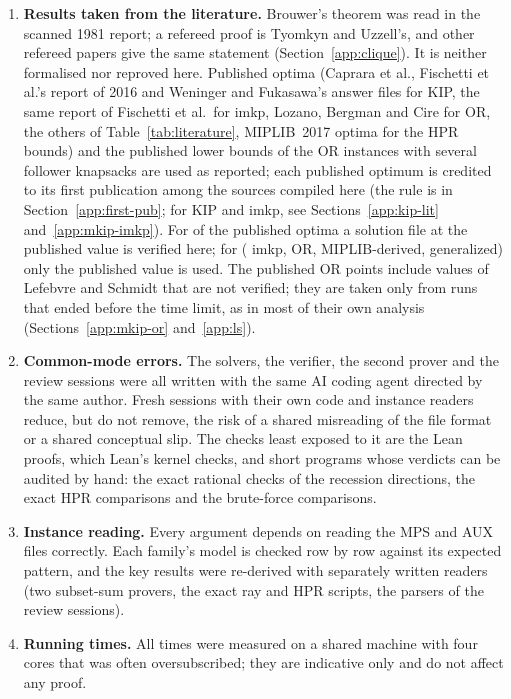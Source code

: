 \begin{enumerate}
\item \textbf{Results taken from the literature.} Brouwer's
theorem\cite{brouwer1981lotto} was read in the scanned 1981 report; a refereed
proof is Tyomkyn and Uzzell's,\cite{tyomkyn2015strong} and other refereed papers
give the same statement (Section~\ref{app:clique}). It is neither formalised nor
reproved here. Published optima (Caprara et al., Fischetti et al.'s report of
2016 and Weninger and Fukasawa's answer
files\cite{caprara2016bilevel,fischetti2016monotonicity,weninger_bkpsolver} for
KIP, the same report of Fischetti et al.\ for imkp, Lozano, Bergman
and Cire\cite{lozano2026network} for OR, the others of
Table~\ref{tab:literature}, MIPLIB~2017 optima\cite{gleixner2021miplib}
for the HPR bounds) and the published lower bounds of the
OR instances with several follower knapsacks are used as reported; each
published optimum is credited to its first publication among the sources
compiled here (the rule is in Section~\ref{app:first-pub}; for KIP and imkp, see
Sections~\ref{app:kip-lit} and~\ref{app:mkip-imkp}). For
\NumLitWithFile{} of the \NumLitOptimal{} published optima a solution file at
the published value is verified here; for \NumLitNoFile{}
(\NumLitNoFileImkp{} imkp, \NumLitNoFileOr{} OR, \NumLitNoFileMiplib{}
MIPLIB-derived, \NumLitNoFileGeneralized{} generalized) only the published value
is used. The published OR points include values of Lefebvre and
Schmidt\cite{lefebvre2025dantzig} that are not verified; they are taken only
from runs that ended before the time limit, as in most of their own analysis
(Sections~\ref{app:mkip-or} and~\ref{app:ls}).

\item \label{it:common}\textbf{Common-mode errors.} The solvers, the verifier,
the second prover and the review sessions were all written with the same AI
coding agent directed by the same author. Fresh sessions with their own code
and instance readers reduce, but do not remove, the risk of a shared
misreading of the file format or a shared conceptual slip. The checks least
exposed to it are the Lean proofs, which Lean's kernel checks, and short
programs whose verdicts can be audited by hand: the exact rational checks of
the recession directions, the exact HPR comparisons and the brute-force
comparisons.

\item \textbf{Instance reading.} Every argument depends on reading the MPS
and AUX files correctly. Each family's model is checked row by row against
its expected pattern, and the key results were re-derived with separately
written readers (two subset-sum provers, the exact ray and HPR scripts, the
parsers of the review sessions).

\item \textbf{Running times.} All times were measured on a shared machine
with four cores that was often oversubscribed; they are indicative only and
do not affect any proof.
\end{enumerate}

